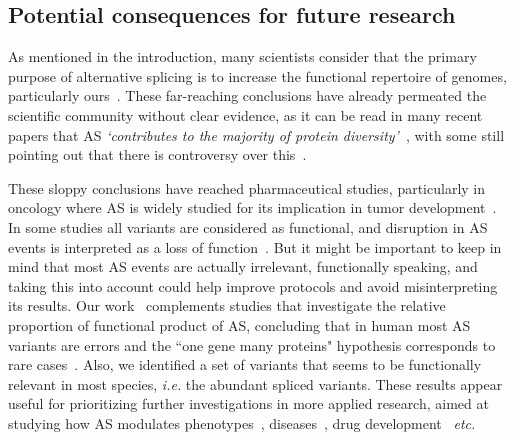 \subsection{Potential consequences for future research}

As mentioned in the introduction, many scientists consider that the primary purpose of alternative splicing is to increase the functional repertoire of genomes, particularly ours~\citep{graveley_alternative_2001, black_mechanisms_2003, pan_deep_2008, nilsen_expansion_2010, blencowe_relationship_2017}. These far-reaching conclusions have already permeated the scientific community without clear evidence, as it can be read in many recent papers that \acrshort{AS} \textit{`contributes to the majority of protein diversity'}~\citep{jiang_alternative_2020, verta_role_2022, singh_importance_2022, manuel_re-evaluating_2023}, with some still pointing out that there is controversy over this~\citep{pozo_assessing_2021, wright_alternative_2022, singh_importance_2022, manuel_re-evaluating_2023}.

These sloppy conclusions have reached pharmaceutical studies, particularly in oncology where \acrshort{AS} is widely studied for its implication in tumor development~\citep{venables_aberrant_2004, kalnina_alterations_2005, srebrow_connection_2006, david_alternative_2010, huang_rna_2020, qi_significance_2020, sciarrillo_role_2020}. In some studies all variants are considered as functional, and disruption in \acrshort{AS} events is interpreted as a loss of function~\citep{schmitz_widespread_2020, cummings_transcript_2020}. But it might be important to keep in mind that most \acrshort{AS} events are actually irrelevant, functionally speaking, and taking this into account could help improve protocols and avoid misinterpreting its results. Our work~\citep{benitiere_random_2024} complements studies that investigate the relative proportion of functional product of AS, concluding that in human most \acrshort{AS} variants are errors and the “one gene many proteins" hypothesis corresponds to rare cases~\citep{pickrell_noisy_2010, gonzalez-porta_transcriptome_2013, tress_most_2017, tress_alternative_2017, saudemont_fitness_2017}. Also, we identified a set of variants that seems to be functionally relevant in most species, \textit{i.e.} the abundant spliced variants. These results appear useful for prioritizing further investigations in more applied research, aimed at studying how \acrshort{AS} modulates \gls{phenotype}s~\citep{verta_role_2022, singh_importance_2022}, diseases~\citep{scotti_rna_2016}, drug development~\citep{ren_alternative_2021} \textit{etc.}

